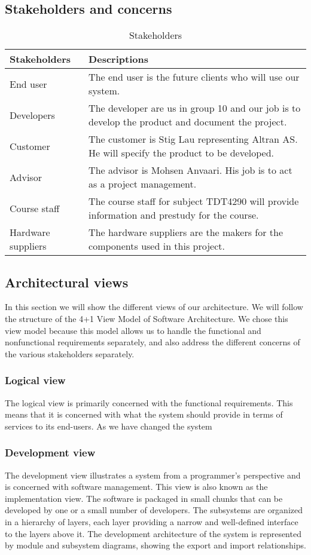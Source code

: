 \documentclass[../document]{subfiles}
\begin{document}
\subsection{Stakeholders and concerns}
\begin{table}[H]
	\caption{Stakeholders}
	\begin{tabularx}{\textwidth}{|X|X|}
		\hline
		\textbf{Stakeholders}	& \textbf{Descriptions} \\ \hline
		End user				& The end user is the future clients who will use our system.  \\ \hline
		Developers				& The developer are us in group 10 and our job is to develop the product and document the project.  \\ \hline
		Customer				& The customer is Stig Lau representing Altran AS. He will specify the product to be developed.  \\ \hline
		Advisor					& The advisor is Mohsen Anvaari. His job is to act as a project management.  \\ \hline
		Course staff			& The course staff for subject TDT4290 will provide information and prestudy for the course.  \\ \hline
		Hardware suppliers		& The hardware suppliers are the makers for the components used in this project.  \\ \hline
	\end{tabularx}
\end{table}

\subsection{Architectural views}
In this section we will show the different views of our architecture. We will follow the structure of the 4+1 View Model of Software Architecture. We chose this view model because this model allows us to handle the functional and nonfunctional requirements separately, and also address the different concerns of the various stakeholders separately.

\subsubsection{Logical view}				
The logical view is primarily concerned with the functional requirements. This means that it is concerned with what the system should provide in terms of services to its end-users. As we have changed the system 



\subsubsection{Development view}
The development view illustrates a system from a programmer's perspective and is concerned with software management. This view is also known as the implementation view. The software is packaged in small chunks that can be developed by one or a small number of developers. The subsystems are organized in a hierarchy of layers, each layer providing a narrow and well-defined interface to the layers above it. The development architecture of the system is represented by module and subsystem diagrams, showing the export and import relationships. 
 
\end{document}
